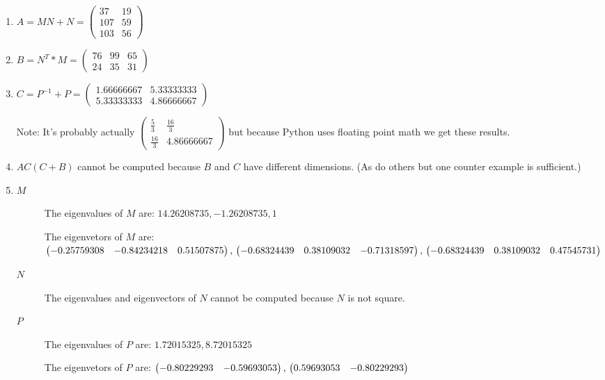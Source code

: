 \documentclass[12pt]{article}
\begin{document}
\begin{enumerate}[a]
	\item %
	$A = MN + N =
	\begin{pmatrix}
		37 & 19\\
		107 & 59\\
		103 & 56
	\end{pmatrix}$

	\item %
	$B = N^T * M =
	\begin{pmatrix}
		76 & 99 & 65\\
		24 & 35 & 31
	\end{pmatrix}$

	\item %
	$C = P^{-1} + P =
	\begin{pmatrix}
		1.66666667 & 5.33333333\\
		5.33333333 & 4.86666667
	\end{pmatrix}$

	Note: It's probably actually
	$\begin{pmatrix}
		\frac{5}{3} & \frac{16}{3}\\
		\frac{16}{3} & 4.86666667
	\end{pmatrix}$
	but because Python uses floating point math we get these results.

	\item %
	$AC (C + B)$ cannot be computed because $B$ and $C$ have different dimensions. (As do others but one counter example is sufficient.)

	\item %
	\begin{description}
		\item [$M$]
		The eigenvalues of $M$ are: $14.26208735, -1.26208735, 1$

		The eigenvetors of $M$ are:
		$\begin{pmatrix}
			-0.25759308 & -0.84234218 & 0.51507875
		\end{pmatrix},\\
		\begin{pmatrix}
			-0.68324439 & 0.38109032 & -0.71318597
		\end{pmatrix},\\
		\begin{pmatrix}
			-0.68324439 & 0.38109032 & 0.47545731
		\end{pmatrix}$

		\item [$N$]
		The eigenvalues and eigenvectors of $N$ cannot be computed because $N$ is not square.

		\item [$P$]
		The eigenvalues of $P$ are: $1.72015325, 8.72015325$

		The eigenvetors of $P$ are:
		$\begin{pmatrix}
			-0.80229293 & -0.59693053
		\end{pmatrix},\\
		\begin{pmatrix}
			0.59693053 & -0.80229293
		\end{pmatrix}$
	\end{description}
\end{enumerate}
\end{document}
